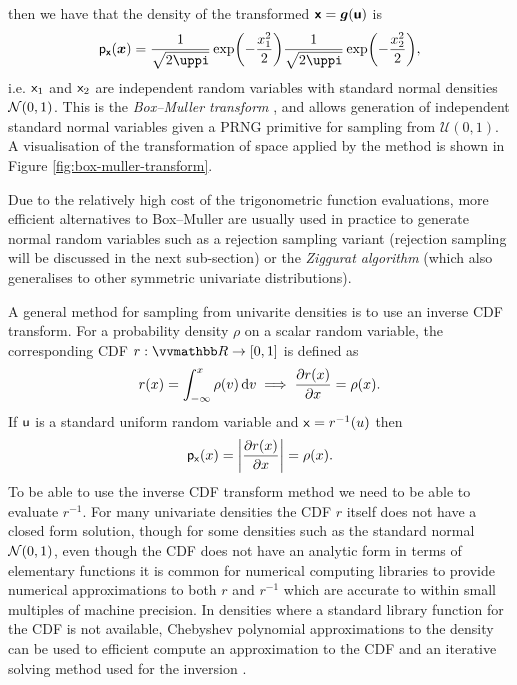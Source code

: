 then we have that the density of the transformed $\boldsymbol{\mathsf{x}} = \boldsymbol{g}(\boldsymbol{\mathsf{u}})$ is
\begin{equation}\label{eq:box-muller-transform-density}
  \pden{\rvct{x}}(\vct{x}) = 
  \frac{1}{\sqrt{2\uppi}}\exp\lpa-\frac{x_1^2}{2}\rpa
  \frac{1}{\sqrt{2\uppi}}\exp\lpa-\frac{x_2^2}{2}\rpa ,
\end{equation}
i.e. $\mathsf{x}_1$ and $\mathsf{x}_2$ are independent random variables with standard normal densities $\nrm{0,1}$. This is the \emph{Box--Muller transform} \citep{box1958note}, and allows generation of independent standard normal variables given a \ac{PRNG} primitive for sampling from $\mathcal{U}(0,1)$. A visualisation of the transformation of space applied by the method is shown in Figure \ref{fig:box-muller-transform}. 

Due to the relatively high cost of the trigonometric function evaluations, more efficient alternatives to Box--Muller are usually used in practice to generate normal random variables such as a rejection sampling variant \citep{marsaglia1968random} (rejection sampling will be discussed in the next sub-section) or the \emph{Ziggurat algorithm} \citep{marsaglia2000ziggurat} (which also generalises to other symmetric univariate distributions).

A general method for sampling from univarite densities is to use an inverse \ac{CDF} transform. For a probability density $\rho$ on a scalar random variable, the corresponding \ac{CDF} $r : \reals \to [0,1]$ is defined as
\begin{equation}
  r(x) = \int_{-\infty}^x \rho(v) \,\mathrm{d} v
  \implies
  \frac{\partial r(x)}{\partial x} = \rho(x).
\end{equation}
If $\mathsf{u}$ is a standard uniform random variable and $\mathsf{x} = r^{-1}(u)$ then
\begin{equation}
  \pden{\rvar{x}}(x) = \left|\pd{r(x)}{x}\right| = \rho(x).
\end{equation}
To be able to use the inverse \ac{CDF} transform method we need to be able to evaluate $r^{-1}$. For many univariate densities the \ac{CDF} $r$ itself does not have a closed form solution, though for some densities such as the standard normal $\nrm{0,1}$, even though the \ac{CDF} does not have an analytic form in terms of elementary functions it is common for numerical computing libraries to provide numerical approximations to both $r$ and $r^{-1}$ which are accurate to within small multiples of machine precision. In densities where a standard library function for the \ac{CDF} is not available, Chebyshev polynomial approximations to the density can be used to efficient compute an approximation to the \ac{CDF} and an iterative solving method used for the inversion \citep{olver2013fast}.


